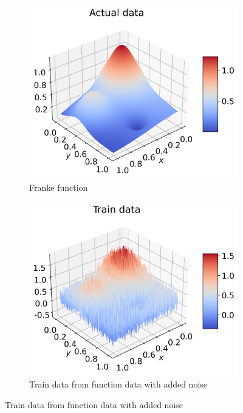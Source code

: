 \documentclass[12pt]{article}
\begin{document}
\begin{figure}[H]
  \begin{subfigure}{.5\textwidth}
    \centering
    \includegraphics[width=\textwidth]{../figures/actual_data_franke_extra.png}
    \caption{Franke function}
    \label{fig:extra_pred_real}
  \end{subfigure}
  \begin{subfigure}{.5\textwidth}
    \centering
    \includegraphics[width=\textwidth]{../figures/train_data_franke_extra.png}
    \caption{Train data from function data with added noise}

\end{subfigure}
\end{figure}
\end{document}
